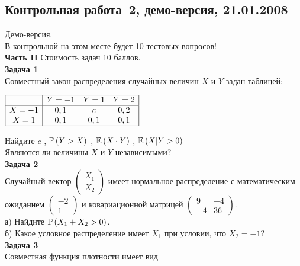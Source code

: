 \documentclass[pdftex,12pt,a4paper]{article}
\begin{document}
\subsection{Контрольная работа \No\,2, демо-версия, 21.01.2008}

Демо-версия. \\

В контрольной на этом месте будет 10 тестовых вопросов! \\


\textbf{Часть II} Стоимость задач 10 баллов. \\

\textbf{Задача 1} \\ %
Совместный закон распределения случайных величин  $X$  и  $Y$
задан таблицей:

$\begin{array}{|c|ccc|} 
\hline 
{} & {Y=-1} & {Y=1} & {Y=2}\\  
\hline 
{X=-1} & {0,1} & {c} & {0,2}\\ 
{X=1} & {0,1} & {0,1} & {0,1} \\  
\hline  
\end{array}$

Найдите  $c$ ,  $\P\left(Y>X\right)$ ,  $\E\left(X\cdot Y
\right)$ ,  $\E\left(X|Y>0\right)$ \\
Являются ли величины $X$ и $Y$ независимыми? \\

\textbf{Задача 2} \\ %
Случайный вектор  $\left(\begin{array}{c}
{X_{1} } \\ {X_{2} }
\end{array}\right)$  имеет нормальное распределение с
математическим ожиданием  $\left(\begin{array}{c} {-2} \\ {1}
\end{array}\right)$  и ковариационной матрицей
$\left(\begin{array}{cc} {9} & {-4} \\ {-4} & {36}
\end{array}\right)$. \\
а) Найдите  $\P\left(X_{1} +X_{2} >0\right)$. \\
б) Какое условное распределение имеет $X_{1}$ при условии, что $X_{2}=-1$? \\

\textbf{Задача 3} \\ %
Совместная функция плотности имеет вид
\end{document}
